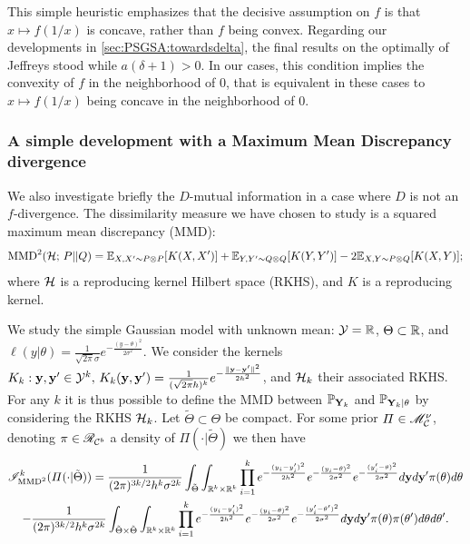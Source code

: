         This simple heuristic emphasizes that the decisive assumption on $f$ is that $x\mapsto f(1/x)$ is concave, rather than $f$ being convex.
        Regarding our developments in  \cref{sec:PSGSA:towardsdelta}, the final results on the optimally of Jeffreys stood while $a(\delta+1)>0$.
        In our cases, this condition implies the convexity of $f$ in the neighborhood of $0$, that is equivalent in these cases to $x\mapsto f(1/x)$ being concave in the neighborhood of $0$.
        



        
        \subsubsection{A simple development with a Maximum Mean Discrepancy divergence}


        We also investigate briefly the $D$-mutual information in a case where $D$ is not an $f$-divergence. The dissimilarity measure we have chosen to study is a squared maximum mean discrepancy (MMD):
                \begin{equation}
                    \text{MMD}^2(\mathcal{H};\,P||Q) = \mathbb{E}_{X,X'\sim P\otimes P}[K(X,X')] + \mathbb{E}_{Y,Y'\sim Q\otimes Q}[K(Y,Y')] - 2\mathbb{E}_{X,Y\sim P\otimes Q}[K(X,Y)];
                \end{equation}
        where $\mathcal{H}$ is a reproducing kernel Hilbert space (RKHS), and $K$ is a reproducing kernel.

        We study the simple Gaussian model with unknown mean: $\mathcal{Y}=\mathbb{R}$, $\Theta\subset\mathbb{R} $, and $\ell(y|\theta)=\frac{1}{\sqrt{2\pi}\sigma}e^{-\frac{(y-\theta)^2}{2\sigma^2}}$. 
        We consider the kernels $K_k:\mathbf{y},\mathbf{y}'\in\mathcal{Y}^k,\,K_k(\mathbf{y},\mathbf{y}')= \frac{1}{(\sqrt{2\pi}h)^k}e^{-\frac{\|\mathbf{y}-\mathbf{y}'\|^2}{2h^2}}$, and $\mathcal{H}_k$ their associated RKHS. 
        For any $k$ it is thus possible to define the MMD between $\mathbb{P}_{\mathbf{Y}_k}$ and $\mathbb{P}_{\mathbf{Y}_k|\theta}$ by considering the RKHS $\mathcal{H}_k$.
        Let $\tilde\Theta\subset\Theta$ be compact. %
        For some prior $\varPi\in\mathscr{M}^\nu_{\mathcal{C}}$, denoting $\pi\in\mathscr{R}_{\mathcal{C}^b}$ a  density of $\varPi(\cdot|\tilde\Theta)$ we then have
            \begin{multline}
                \mathscr{I}_{\text{MMD}^2}^k(\varPi(\cdot|\tilde\Theta)) =\frac{1}{(2\pi)^{3k/2} h^k\sigma^{2k}} \int_{\tilde\Theta}\int_{\mathbb{R}^k\times\mathbb{R}^k} \prod_{i=1}^ke^{-\frac{(y_i-y_i')^2}{2h^2}} e^{-\frac{(y_i-\theta)^2}{2\sigma^2} } e^{-\frac{(y_i'-\theta)^2}{2\sigma^2} }  d\mathbf{y}d\mathbf{y}'\pi(\theta)d\theta \\
                - \frac{1}{(2\pi)^{3k/2}h^k\sigma^{2k}} \int_{\tilde\Theta\times\tilde\Theta}\int_{\mathbb{R}^k\times\mathbb{R}^k} \prod_{i=1}^ke^{-\frac{(y_i-y_i')^2}{2h^2}} e^{-\frac{(y_i-\theta)^2}{2\sigma^2} } e^{-\frac{(y_i'-\theta')^2}{2\sigma^2} }  d\mathbf{y}d\mathbf{y}'\pi(\theta)\pi(\theta')d\theta d\theta'.
            \end{multline}


